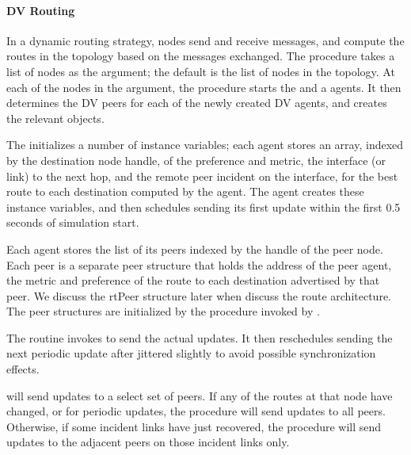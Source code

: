 \paragraph{DV Routing}
In a dynamic routing strategy, nodes send and receive messages,
and compute the routes in the topology based on the messages exchanged.
The procedure
takes a list of nodes as the argument;
the default is the list of nodes in the topology.
At each of the nodes in the argument, the procedure starts the
 and a 
 agents.
It then determines the DV peers for each of the newly created DV agents,
and creates the relevant  objects.

The
initializes a number of instance variables;
each agent stores an array, indexed by the destination node handle,
of the preference and metric, the interface (or link) to the next hop,
and the remote peer incident on the interface,
for the best route to each destination computed by the agent.
The agent creates these instance variables, and then
schedules sending its first update within the first
0.5 seconds of simulation start.

Each agent stores the list of its peers indexed by the handle
of the peer node.
Each peer is a separate peer structure that holds
the address of the peer agent, the metric and preference
of the route to each destination advertised by that peer.
We discuss the rtPeer structure later
when discuss the route architecture.
The peer structures are initialized by the procedure
invoked by .

The routine 
invokes  to send the actual updates.
It then reschedules sending the next periodic update
after  jittered slightly to avoid
possible synchronization effects.

will send updates to a select set of peers.
If any of the routes at that node have changed, or for periodic updates,
the procedure will send updates to all peers.
Otherwise, if some incident links have just recovered,
the procedure will send updates to the adjacent peers on those incident
links only.

